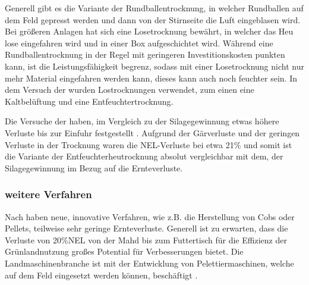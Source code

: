 Generell gibt es die Variante der Rundballentrocknung, in welcher Rundballen auf dem Feld gepresst werden und dann von der Stirnseite die Luft eingeblasen wird.
Bei größeren Anlagen hat sich eine Losetrocknung bewährt, in welcher das Heu lose eingefahren wird und in einer Box aufgeschichtet wird.
Während eine Rundballentrocknung in der Regel mit geringeren Investitionskosten punkten kann, ist die Leistungsfähigkeit begrenz, sodass mit einer Losetrocknung nicht nur mehr Material eingefahren werden kann, dieses kann auch noch feuchter sein.
In dem Versuch der \HBLFA wurden Lostrocknungen verwendet, zum einen eine Kaltbelüftung und eine Entfeuchtertrocknung.

Die Versuche der \HBLFA haben, im Vergleich zu der Silagegewinnung etwas höhere Verluste bis zur Einfuhr festgestellt \parencite{gruber2015einfluss}. 
Aufgrund der Gärverluste und der geringen Verluste in der Trocknung waren die \ac{NEL}-Verluste bei etwa 21\% und somit ist die Variante der Entfeuchterheutrocknung absolut vergleichbar mit dem, der Silagegewinnung \parencite[30]{fritz2018wirtschaftliche} im Bezug auf die Ernteverluste.


\subsubsection{weitere Verfahren}
\label{subsub:Peletts}
Nach \textcite[12f]{engel2013protein} haben neue, innovative Verfahren, wie z.B. die Herstellung von Cobs oder Pellets, teilweise sehr geringe Ernteverluste.
Generell ist zu erwarten, dass die Verluste von 20\%\ac{NEL} von der Mahd bis zum Futtertisch für die Effizienz der Grünlandnutzung großes Potential für Verbesserungen bietet.
Die Landmaschinenbranche ist mit der Entwicklung von Pelettiermaschinen, welche auf dem Feld eingesetzt werden können, beschäftigt \parencite[9]{schrammcrop}.

